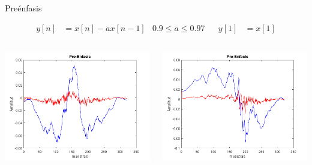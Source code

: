\documentclass{beamer}
\begin{document}
%
\begin{frame}{Preénfasis}

\begin{align*}
y[n] &= x[n]-ax[n-1] & 0.9\leq a\leq 0.97 && y[1] &= x[1]
\end{align*}

\begin{columns}
\begin{column}{0.5\linewidth}
\includegraphics[width=\linewidth]{preenfasis90}
\end{column}
%
\begin{column}{0.5\linewidth}
\includegraphics[width=\linewidth]{preenfasis90_1}
\end{column}
\end{columns}

\end{frame}
\end{document}

